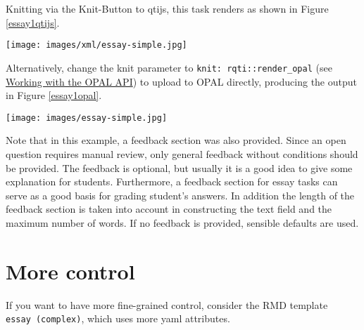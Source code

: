 \documentclass[twoside]{tufte-book}
\begin{document}
Knitting via the Knit-Button to qtijs, this task renders as shown in Figure \ref{essay1qtijs}.

\begin{figure*}
\centering
\texttt{[image: images/xml/essay-simple.jpg]}
\caption{\label{essay1qtijs}Simple essay erxercise rendered by qtijs}
\end{figure*}

\noindent Alternatively, change the knit parameter to \texttt{knit:\ rqti::render\_opal} (see \href{api_opal.html}{Working with the OPAL API}) to upload to OPAL directly, producing the output in Figure \ref{essay1opal}.

\begin{figure*}
\centering
\texttt{[image: images/essay-simple.jpg]}
\caption{\label{essay1opal}Simple essay task rendered by OPAL}
\end{figure*}

Note that in this example, a feedback section was also provided. Since an open question requires manual review, only general feedback without conditions should be provided. The feedback is optional, but usually it is a good idea to give some explanation for students. Furthermore, a feedback section for essay tasks can serve as a good basis for grading student's answers. In addition the length of the feedback section is taken into account in constructing the text field and the maximum number of words. If no feedback is provided, sensible defaults are used.

\section{More control}\label{more-control-4}

If you want to have more fine-grained control, consider the RMD template \texttt{essay\ (complex)}, which uses more yaml attributes.
\end{document}

